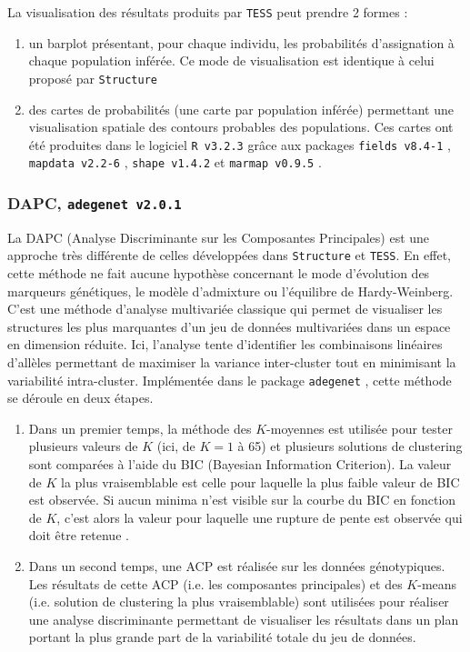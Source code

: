 \documentclass[a4paper,12pt,twoside]{article}\usepackage[]{graphicx}\usepackage[]{color}
\begin{document}
\begin {bibunit} [newbst]
La visualisation des résultats produits par \texttt{TESS} peut prendre 2 formes :
\begin{enumerate}
	\item un barplot présentant, pour chaque individu, les probabilités d'assignation à chaque population inférée. Ce mode de visualisation est identique à celui proposé par \texttt{Structure}
	\item des cartes de probabilités (une carte par population inférée) permettant une visualisation spatiale des contours probables des populations. Ces cartes ont été produites dans le logiciel \texttt{R~v3.2.3} \citep{rct2015} grâce aux packages \texttt{fields~v8.4-1} \citep{nychka2015}, \texttt{mapdata~v2.2-6} \citep{becker2016}, \texttt{shape~v1.4.2} \citep{soetaert2014} et \texttt{marmap~v0.9.5} \citep{pante2013}.
\end{enumerate}

\subsubsection*{DAPC, \texttt{adegenet~v2.0.1} \citep{jombart2008}}

La DAPC (Analyse Discriminante sur les Composantes Principales) est une approche très différente de celles développées dans \texttt{Structure} et \texttt{TESS}. En effet, cette méthode ne fait aucune hypothèse concernant le mode d'évolution des marqueurs génétiques, le modèle d'admixture ou l'équilibre de Hardy-Weinberg. C'est une méthode d'analyse multivariée classique qui permet de visualiser les structures les plus marquantes d'un jeu de données multivariées dans un espace en dimension réduite. Ici, l'analyse tente d'identifier les combinaisons linéaires d'allèles permettant de maximiser la variance inter-cluster tout en minimisant la variabilité intra-cluster.
Implémentée dans le package \texttt{adegenet} \citep{jombart2008}, cette méthode se déroule en deux étapes.
\begin{enumerate}
	\item Dans un premier temps, la méthode des $K$-moyennes est utilisée pour tester plusieurs valeurs de $K$ (ici, de $K=1$ à 65) et plusieurs solutions de clustering sont comparées à l'aide du BIC (Bayesian Information Criterion). La valeur de $K$ la plus vraisemblable est celle pour laquelle la plus faible valeur de BIC est observée. Si aucun minima n'est visible sur la courbe du BIC en fonction de $K$, c'est alors la valeur pour laquelle une rupture de pente est observée qui doit être retenue \citep{jombart2008}.
	\item Dans un second temps, une ACP est réalisée sur les données génotypiques. Les résultats de cette ACP (i.e. les composantes principales) et des $K$-means (i.e. solution de clustering la plus vraisemblable) sont utilisées pour réaliser une analyse discriminante permettant de visualiser les résultats dans un plan portant la plus grande part de la variabilité totale du jeu de données.\\[1pc]
\end{enumerate}




\end{bibunit}
\end{document}
